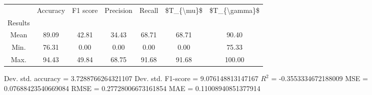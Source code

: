\begin{tabular}{|c|c|c|c|c|c|c|}
\toprule
{} &  Accuracy &  F1 score &  Precision &  Recall &  \$T\_\{\textbackslash mu\}\$ &  \$T\_\{\textbackslash gamma\}\$ \\
Results &           &           &            &         &            &               \\
\hline
Mean    &     89.09 &     42.81 &      34.43 &   68.71 &      68.71 &         90.40 \\
Min.    &     76.31 &      0.00 &       0.00 &    0.00 &       0.00 &         75.33 \\
Max.    &     94.43 &     49.84 &      68.75 &   91.68 &      91.68 &        100.00 \\
\bottomrule
\end{tabular}

 Dev. std. accuracy = 3.7288766264321107
 Dev. std. F1-score = 9.076148813147167
 $R^2$ = -0.3553334672188009
 MSE = 0.07688423540669084
 RMSE = 0.27728006673161854
 MAE = 0.11008940851377914